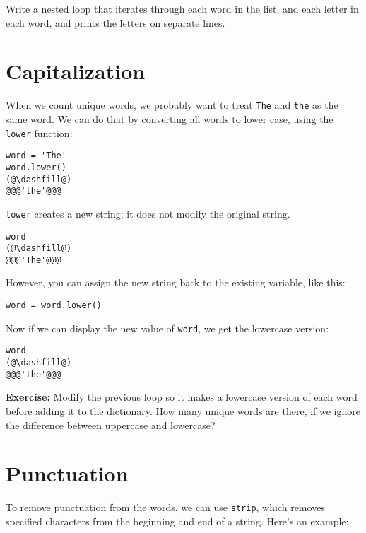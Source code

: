 Write a nested loop that iterates through each word in the list, and
each letter in each word, and prints the letters on separate lines.

\hypertarget{capitalization}{%
\section{Capitalization}\label{capitalization}}

When we count unique words, we probably want to treat
\passthrough{\lstinline!The!} and \passthrough{\lstinline!the!} as the
same word. We can do that by converting all words to lower case, using
the \passthrough{\lstinline!lower!} function:

\begin{lstlisting}[]
word = 'The'
word.lower()
(@\dashfill@)
@@@'the'@@@
\end{lstlisting}

\passthrough{\lstinline!lower!} creates a new string; it does not modify
the original string.

\begin{lstlisting}[]
word
(@\dashfill@)
@@@'The'@@@
\end{lstlisting}

However, you can assign the new string back to the existing variable,
like this:

\begin{lstlisting}[]
word = word.lower()
\end{lstlisting}

Now if we can display the new value of \passthrough{\lstinline!word!},
we get the lowercase version:

\begin{lstlisting}[]
word
(@\dashfill@)
@@@'the'@@@
\end{lstlisting}

\textbf{Exercise:} Modify the previous loop so it makes a lowercase
version of each word before adding it to the dictionary. How many unique
words are there, if we ignore the difference between uppercase and
lowercase?

\hypertarget{punctuation}{%
\section{Punctuation}\label{punctuation}}

To remove punctuation from the words, we can use
\passthrough{\lstinline!strip!}, which removes specified characters from
the beginning and end of a string. Here's an example:

